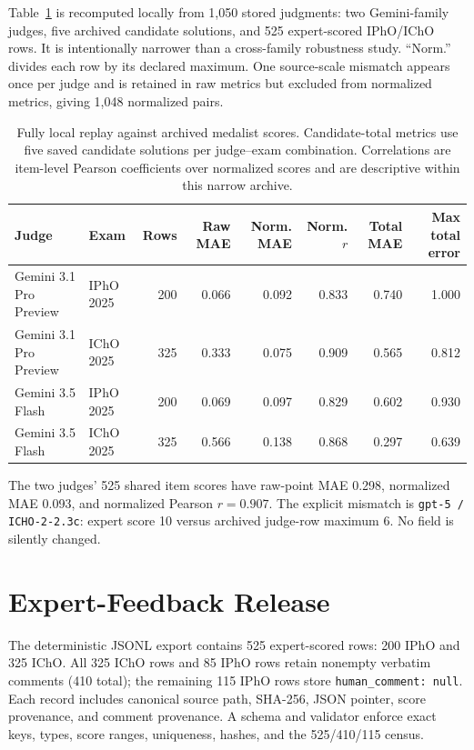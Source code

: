 \documentclass[11pt]{article}
\begin{document}
Table~\ref{tab:calibration-replay} is recomputed locally from 1,050 stored judgments: two Gemini-family judges, five archived candidate solutions, and 525 expert-scored IPhO/IChO rows. It is intentionally narrower than a cross-family robustness study. ``Norm.'' divides each row by its declared maximum. One source-scale mismatch appears once per judge and is retained in raw metrics but excluded from normalized metrics, giving 1,048 normalized pairs.

\begin{table}[t]
\centering
\small
\setlength{\tabcolsep}{5pt}
\begin{tabular}{llrrrrrr}
\toprule
\textbf{Judge} & \textbf{Exam} & \textbf{Rows} & \textbf{Raw MAE} & \textbf{Norm. MAE} & \textbf{Norm. $r$} & \textbf{Total MAE} & \textbf{Max total error} \\
\midrule
Gemini 3.1 Pro Preview & IPhO 2025 & 200 & 0.066 & 0.092 & 0.833 & 0.740 & 1.000 \\
Gemini 3.1 Pro Preview & IChO 2025 & 325 & 0.333 & 0.075 & 0.909 & 0.565 & 0.812 \\
Gemini 3.5 Flash & IPhO 2025 & 200 & 0.069 & 0.097 & 0.829 & 0.602 & 0.930 \\
Gemini 3.5 Flash & IChO 2025 & 325 & 0.566 & 0.138 & 0.868 & 0.297 & 0.639 \\
\bottomrule
\end{tabular}
\caption{Fully local replay against archived medalist scores. Candidate-total metrics use five saved candidate solutions per judge--exam combination. Correlations are item-level Pearson coefficients over normalized scores and are descriptive within this narrow archive.}
\label{tab:calibration-replay}
\end{table}

The two judges' 525 shared item scores have raw-point MAE 0.298, normalized MAE 0.093, and normalized Pearson $r=0.907$. The explicit mismatch is \texttt{gpt-5 / ICHO-2-2.3c}: expert score 10 versus archived judge-row maximum 6. No field is silently changed.

\section{Expert-Feedback Release}
\label{app:feedback-release}

The deterministic JSONL export contains 525 expert-scored rows: 200 IPhO and 325 IChO. All 325 IChO rows and 85 IPhO rows retain nonempty verbatim comments (410 total); the remaining 115 IPhO rows store \texttt{human\_comment: null}. Each record includes canonical source path, SHA-256, JSON pointer, score provenance, and comment provenance. A schema and validator enforce exact keys, types, score ranges, uniqueness, hashes, and the 525/410/115 census.
\end{document}
